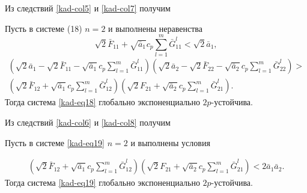 Из следствий \ref{kad-col5} и \ref{kad-col7} получим
\begin{corollary}\label{kad-col8}
Пусть в системе (18) $n = 2$ и выполнены
неравенства
$$
\sqrt{2}\bar F_{11} + \sqrt{\bar a_1}c_p\sum \limits _{l=1}^m \bar
G^l_{11} < \sqrt{2}\bar a_1,
$$
$$
\begin{array}{crl}
(\sqrt{2}\bar a_1 - \sqrt{2}\bar F_{11} - \sqrt{\bar a_1}c_p\sum
\limits _{l=1}^m \bar G^l_{11})(\sqrt{2}\bar a_2 - \sqrt{2}\bar
F_{22} - \sqrt{\bar a_2}c_p\sum \limits _{l=1}^m \bar G^l_{22}) >\\
(\sqrt{2}\bar F_{12} + \sqrt{\bar a_1}c_p\sum \limits _{l=1}^m \bar
G^l_{12})(\sqrt{2}F_{21} + \sqrt{\bar a_2} c_p\sum \limits _{l=1}^m
\bar G^l_{21}).
\end{array}
$$
Тогда система \eqref{kad-eq18} глобально экспоненциально $2p$-устойчива.
\end{corollary}
Из следствий \ref{kad-col6} и \ref{kad-col8} получим
\begin{corollary}\label{kad-col9}
Пусть в системе \eqref{kad-eq19} $n = 2$ и выполнены
условия

$$
\begin{array}{crl}
(\sqrt{2}\bar F_{12} + \sqrt{\bar a_1}c_p\sum \limits _{l=1}^m \bar
G^l_{12})(\sqrt{2}F_{21} + \sqrt{\bar a_2} c_p\sum \limits _{l=1}^m
\bar G^l_{21}) < 2\bar a_1 \bar a_2 .
\end{array}
$$
Тогда система \eqref{kad-eq19} глобально экспоненциально $2p$-устойчива.
\end{corollary}

